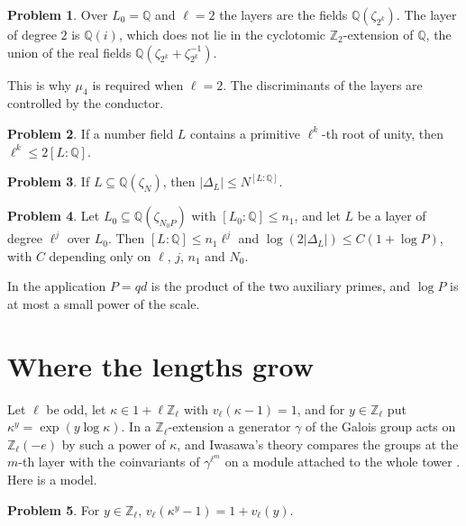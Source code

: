 \documentclass[reqno]{amsart}
\theoremstyle{definition}
\newtheorem{problem}{Problem}[section]
\theoremstyle{plain}
\theoremstyle{remark}
\newcommand{\Z}{\mathbb{Z}}
\newcommand{\Q}{\mathbb{Q}}
\newcommand{\Zl}{\Z_\ell}
\begin{document}
\begin{problem}\label{pr:Qi}
Over \(L_0=\Q\) and \(\ell=2\) the layers are the fields \(\Q(\zeta_{2^k})\).  The layer of degree \(2\) is \(\Q(i)\), which does not lie in the cyclotomic \(\Z_2\)-extension of \(\Q\), the union of the real fields \(\Q(\zeta_{2^k}+\zeta_{2^k}^{-1})\).
\end{problem}

This is why \(\mu_4\) is required when \(\ell=2\).  The discriminants of the layers are controlled by the conductor.

\begin{problem}\label{pr:root-degree}
If a number field \(L\) contains a primitive \(\ell^k\)-th root of unity, then \(\ell^k\le2[L:\Q]\).
\end{problem}

\begin{problem}\label{pr:cond-disc}
If \(L\subseteq\Q(\zeta_N)\), then \(\lvert\Delta_L\rvert\le N^{[L:\Q]}\).
\end{problem}

\begin{problem}\label{pr:layer-disc}
Let \(L_0\subseteq\Q(\zeta_{N_0P})\) with \([L_0:\Q]\le n_1\), and let \(L\) be a layer of degree \(\ell^j\) over \(L_0\).  Then \([L:\Q]\le n_1\ell^j\) and \(\log(2\lvert\Delta_L\rvert)\le C(1+\log P)\), with \(C\) depending only on \(\ell\), \(j\), \(n_1\) and \(N_0\).
\end{problem}

In the application \(P=qd\) is the product of the two auxiliary primes, and \(\log P\) is at most a small power of the scale.

\section{Where the lengths grow}\label{sec:model}

Let \(\ell\) be odd, let \(\kappa\in1+\ell\Zl\) with \(v_\ell(\kappa-1)=1\), and for \(y\in\Zl\) put \(\kappa^y=\exp(y\log\kappa)\).  In a \(\Zl\)-extension a generator \(\gamma\) of the Galois group acts on \(\Zl(-e)\) by such a power of \(\kappa\), and Iwasawa's theory compares the groups at the \(m\)-th layer with the coinvariants of \(\gamma^{\ell^m}\) on a module attached to the whole tower \cite[Ch.~13]{Wa}.  Here is a model.

\begin{problem}\label{pr:val-power}
For \(y\in\Zl\), \(v_\ell(\kappa^y-1)=1+v_\ell(y)\).
\end{problem}
\end{document}
